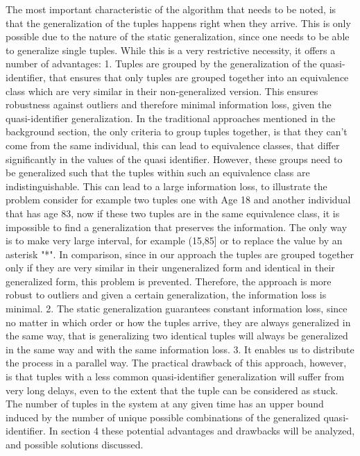 \noindent The most important characteristic of the algorithm that needs to be noted, is that the generalization of the tuples happens right when they arrive. This is only possible due to the nature of the static generalization, since one needs to be able to generalize single tuples. While this is a very restrictive necessity, it offers a number of advantages: 
1. Tuples are grouped by the generalization of the quasi-identifier, that ensures that only tuples are grouped together into an equivalence class which are very similar in their non-generalized version. This ensures robustness against outliers and therefore minimal information loss, given the quasi-identifier generalization. In the traditional approaches mentioned in the background section, the only criteria to group tuples together, is that they can't come from the same individual, this can lead to equivalence classes, that differ significantly in the values of the quasi identifier. However, these groups need to be generalized such that the tuples within such an equivalence class are indistinguishable. This can lead to a large information loss, to illustrate the problem consider for example two tuples one with Age 18 and another individual that has age 83, now if these two tuples are in the same equivalence class, it is impossible to find a generalization that preserves the information. The only way is to make very large interval, for example (15,85] or to replace the value by an asterisk "*". In comparison, since in our approach the tuples are grouped together only if they are very similar in their ungeneralized form and identical in their generalized form, this problem is prevented. Therefore, the approach is more robust to outliers and given a certain generalization, the information loss is minimal. 
2. The static generalization guarantees constant information loss, since no matter in which order or how the tuples arrive, they are always generalized in the same way, that is generalizing two identical tuples will always be generalized in the same way and with the same information loss. 
3. It enables us to distribute the process in a parallel way. The practical drawback of this approach, however, is that tuples with a less common quasi-identifier generalization will suffer from very long delays, even to the extent that the tuple can be considered as stuck. The number of tuples in the system at any given time has an upper bound induced by the number of unique possible combinations of the generalized quasi-identifier. In section 4 these potential advantages and drawbacks will be analyzed, and possible solutions discussed. 

